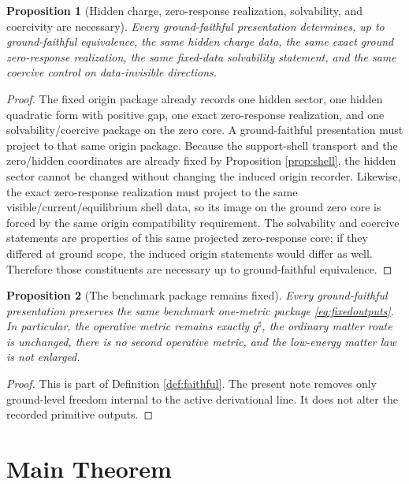 \documentclass[11pt]{article}
\newcommand{\CompletedMetric}{g^{\sharp}}
\newtheorem{proposition}{Proposition}
\begin{document}
\begin{proposition}[Hidden charge, zero-response realization, solvability, and coercivity are necessary]
\label{prop:hidden}
Every ground-faithful presentation determines, up to ground-faithful equivalence, the same hidden charge data, the same exact ground zero-response realization, the same fixed-data solvability statement, and the same coercive control on data-invisible directions.
\end{proposition}

\begin{proof}
The fixed origin package already records one hidden sector, one hidden quadratic form with positive gap, one exact zero-response realization, and one solvability/coercive package on the zero core. A ground-faithful presentation must project to that same origin package. Because the support-shell transport and the zero/hidden coordinates are already fixed by Proposition \ref{prop:shell}, the hidden sector cannot be changed without changing the induced origin recorder. Likewise, the exact zero-response realization must project to the same visible/current/equilibrium shell data, so its image on the ground zero core is forced by the same origin compatibility requirement. The solvability and coercive statements are properties of this same projected zero-response core; if they differed at ground scope, the induced origin statements would differ as well. Therefore those constituents are necessary up to ground-faithful equivalence.
\end{proof}

\begin{proposition}[The benchmark package remains fixed]
\label{prop:benchmark}
Every ground-faithful presentation preserves the same benchmark one-metric package \eqref{eq:fixedoutputs}. In particular, the operative metric remains exactly \(\CompletedMetric\), the ordinary matter route is unchanged, there is no second operative metric, and the low-energy matter law is not enlarged.
\end{proposition}

\begin{proof}
This is part of Definition \ref{def:faithful}. The present note removes only ground-level freedom internal to the active derivational line. It does not alter the recorded primitive outputs.
\end{proof}

\section{Main Theorem}
\end{document}
